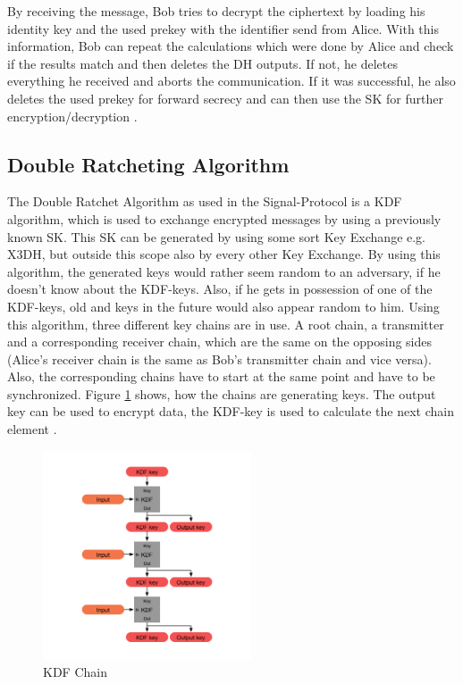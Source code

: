 \documentclass[12pt,oneside,a4paper,parskip]{scrbook}
\begin{document}
By receiving the message, Bob tries to decrypt the ciphertext by loading his identity key and the used prekey with the identifier send from Alice. With this information, Bob can repeat the calculations which were done by Alice and check if the results match and then deletes the DH outputs. If not, he deletes everything he received and aborts the communication. If it was successful, he also deletes the used prekey for forward secrecy and can then use the SK for further encryption/decryption \parencite{marlinspike_x3dh_2016}.

\subsection{Double Ratcheting Algorithm}
\label{subsec:double_ratchet}

The Double Ratchet Algorithm as used in the Signal-Protocol is a KDF algorithm, which is used to exchange encrypted messages by using a previously known SK. This SK can be generated by using some sort Key Exchange e.g. X3DH, but outside this scope also by every other Key Exchange. By using this algorithm, the generated keys would rather seem random to an adversary, if he doesn't know about the KDF-keys. Also, if he gets in possession of one of the KDF-keys, old and keys in the future would also appear random to him. Using this algorithm, three different key chains are in use. A root chain, a transmitter and a corresponding receiver chain, which are the same on the opposing sides (Alice's receiver chain is the same as Bob's transmitter chain and vice versa). Also, the corresponding chains have to start at the same point and have to be synchronized. Figure \ref{fig:KDF_Chain} shows, how the chains are generating keys. The output key can be used to encrypt data, the KDF-key is used to calculate the next chain element \parencite{perrin_double_2016}.
\begin{figure}[ht]
	\centering
  \includegraphics[width=0.55\textwidth]{ressources/kdf_chain.png}
  \caption{KDF Chain \parencite{perrin_double_2016}}
  \label{fig:KDF_Chain}
\end{figure}
\newpage
\end{document}
